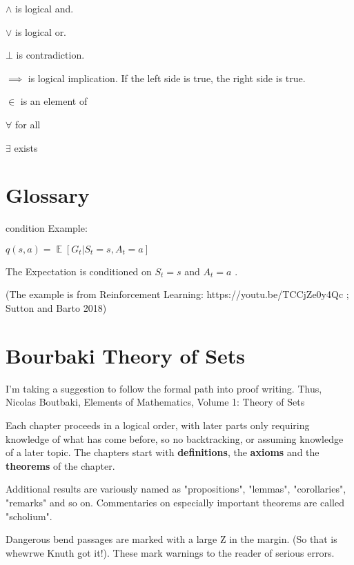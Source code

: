 \documentclass[]{scrartcl}
\DeclareMathOperator{\EX}{\mathbb{E}}%
\begin{document}
$\land$ is logical and.

$\lor$ is logical or.

$\bot$ is contradiction.

$\implies$ is logical implication. If the left side is true, the right side is true.

$\in$ is an element of

$\forall$ for all

$\exists$ exists


\section{Glossary}


\gls{condition} Example: 

$q(s,a) = \EX[G_t |S_t=s, A_t=a]$

The Expectation is conditioned on $S_t=s$ and $A_t=a$ .

(The example is from Reinforcement Learning: https://youtu.be/TCCjZe0y4Qc ; Sutton and Barto 2018)
 

\printglossaries

\section{Bourbaki Theory of Sets}

I'm taking a suggestion to follow the formal path into proof writing. Thus, Nicolas Boutbaki, Elements of Mathematics, Volume 1: Theory of Sets

Each chapter proceeds in a logical order, with later parts only requiring knowledge of what has come before, so no backtracking, or assuming knowledge of a later topic.
The chapters start with \textbf{definitions}, the \textbf{axioms} and the \textbf{theorems} of the chapter.

Additional results are variously named as "propositions", "lemmas", "corollaries",
 "remarks" and so on. Commentaries on especially important theorems are called "scholium".

Dangerous bend passages are marked with a large Z in the margin. (So that is whewrwe Knuth got it!). These mark warnings to the reader of serious errors.
\end{document}
